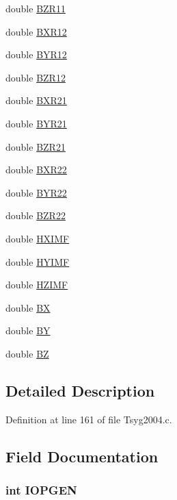 \begin{CompactItemize}
\item 
double \hyperlink{struct___t_s04_info_dde08ef0abaed458dfa0b797e4dbb5bf}{BZR11}
\item 
double \hyperlink{struct___t_s04_info_f458e0735f7ff015dca398deb8590923}{BXR12}
\item 
double \hyperlink{struct___t_s04_info_d23df4618743e8dc55c84f391e76fe8e}{BYR12}
\item 
double \hyperlink{struct___t_s04_info_23500101452343c6ceff7f5d0acdfced}{BZR12}
\item 
double \hyperlink{struct___t_s04_info_a508ffc6a962d5f93b1084c889cb0fb5}{BXR21}
\item 
double \hyperlink{struct___t_s04_info_93d072e6ba972405e72ac04b6cbe06a4}{BYR21}
\item 
double \hyperlink{struct___t_s04_info_cf104617807d9c28716d97945d8bdda9}{BZR21}
\item 
double \hyperlink{struct___t_s04_info_2e25e21de5a89d9a9cf3f39a9cdbf6e6}{BXR22}
\item 
double \hyperlink{struct___t_s04_info_fe8d51a2854838075c65ba5f9453d068}{BYR22}
\item 
double \hyperlink{struct___t_s04_info_417f542193c123afb851fb9ae24759d1}{BZR22}
\item 
double \hyperlink{struct___t_s04_info_8b072a2e8afac1c3e168f081f7f29907}{HXIMF}
\item 
double \hyperlink{struct___t_s04_info_badd0ee294949123f5a7481e23ec4f5e}{HYIMF}
\item 
double \hyperlink{struct___t_s04_info_33e244d5c4043dd47a4c55a6fcdab2e3}{HZIMF}
\item 
double \hyperlink{struct___t_s04_info_0b9b0532b448223253b5d5fefc28ddef}{BX}
\item 
double \hyperlink{struct___t_s04_info_c2f197c29d02f4b0e2b15cbaaf5d8438}{BY}
\item 
double \hyperlink{struct___t_s04_info_361205dbe12b66613d8b2b0036a775f3}{BZ}
\end{CompactItemize}


\subsection{Detailed Description}


Definition at line 161 of file Tsyg2004.c.

\subsection{Field Documentation}
\hypertarget{struct___t_s04_info_cd246ede1b8a4a4fd4696653df7ba165}{
\subsubsection[{IOPGEN}]{\setlength{\rightskip}{0pt plus 5cm}int {\bf IOPGEN}}}
\label{struct___t_s04_info_cd246ede1b8a4a4fd4696653df7ba165}




